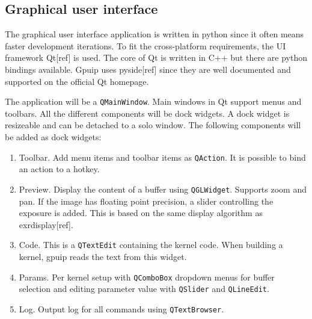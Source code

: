 \subsection{Graphical user interface}

The graphical user interface application is written in python since it often means faster development iterations. To fit the cross-platform requirements, the UI framework Qt[ref] is used. The core of Qt is written in C++ but there are python bindings available. Gpuip uses pyside[ref] since they are well documented and supported on the official Qt homepage. 
\newline

The application will be a {\tt QMainWindow}. Main windows in Qt support menus and toolbars. All the different components will be dock widgets. A dock widget is resizeable and can be detached to a solo window. The following components will be added as dock widgets:

\begin{enumerate}
\item Toolbar. Add menu items and toolbar items as {\tt QAction}. It is possible to bind an action to a hotkey.
\item Preview. Display the content of a buffer using {\tt QGLWidget}. Supports zoom and pan. If the image has floating point precision, a slider controlling the exposure is added. This is based on the same display algorithm as exrdisplay[ref].
\item Code. This is a {\tt QTextEdit} containing the kernel code. When building a kernel, gpuip reads the text from this widget.
\item Params. Per kernel setup with {\tt QComboBox} dropdown menus for buffer selection and editing parameter value with {\tt QSlider} and {\tt QLineEdit}.
\item Log. Output log for all commands using {\tt QTextBrowser}.
\end{enumerate}

